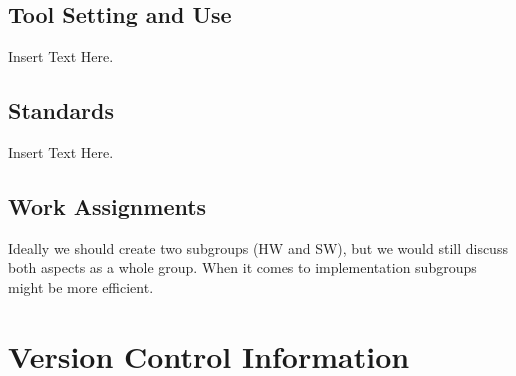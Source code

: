 \documentclass [12pt]{article}
\begin{document}
																																																																			\subsection{Tool Setting and Use}
																																																																			Insert Text Here.


																																																																			\subsection{Standards}
																																																																			Insert Text Here. 

																																																																			\subsection{Work Assignments}

																																																																			Ideally we should create two subgroups (HW and SW), but we would still
																																																																			discuss both aspects as a whole group. When it comes to implementation subgroups might be more efficient.






																																																																			\section{Version Control Information}
\end{document}
